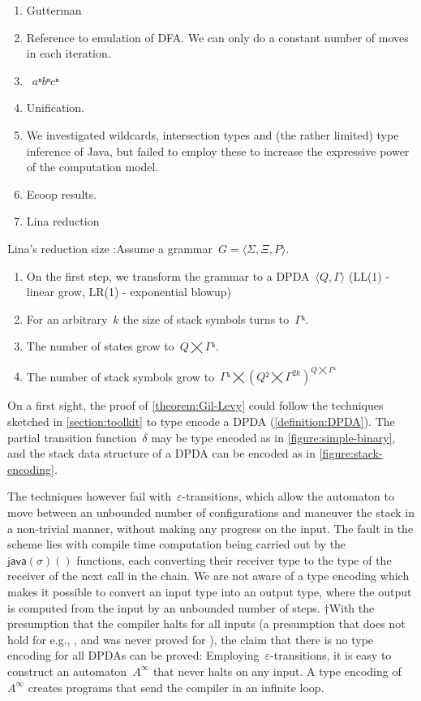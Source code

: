 \begin{enumerate}
  \item Gutterman
  \item Reference to emulation of DFA. We can only do
        a constant number of moves in each iteration.
  \item~$aⁿbⁿcⁿ$
  \item \Prolog Unification.
  \item We investigated wildcards, intersection types and
        (the rather limited) type inference of 
        Java, but failed to employ these to increase the expressive power of the computation model.
  \item Ecoop results.
  \item Lina reduction
\end{enumerate}

Lina's reduction size :Assume a grammar~$G=⟨Σ,Ξ, P⟩$.
    \begin{enumerate}
      \item On the first step, we transform the grammar to a DPDA~$⟨Q,Γ⟩$ (LL(1) - linear grow, LR(1) - exponential blowup)
      \item For an arbitrary~$k$ the size of stack symbols turns to~$Γᵏ$.
      \item The number of states grow to~$Q⨉Γᵏ$.
      \item The number of stack symbols grow to~$Γᵏ⨉(Q²⨉Γ^{2k})^{Q⨉Γᵏ}$
    \end{enumerate}

On a first sight, the proof of \cref{theorem:Gil-Levy} could follow the techniques
  sketched in \cref{section:toolkit} to type encode a DPDA (\cref{definition:DPDA}).
The partial transition function~$δ$ may be type encoded as in \cref{figure:simple-binary},
and the stack data structure of a DPDA can be encoded as in \cref{figure:stack-encoding}.

The techniques however fail with~$ε$-transitions,
  which allow the automaton to move between an unbounded number of
  configurations and maneuver the stack in a non-trivial manner,
  without making any progress on the input.
The fault in the scheme lies with compile time computation being carried out
  by the~$\textsf{java}(σ)()$ functions, each converting
  their receiver type to the type of the receiver of the next call in the chain.
We are not aware of a \Java type encoding which makes
  it possible to convert an input type into an output type, where
  the output is computed from the input by an unbounded number of steps.
  †{With the presumption that the \Java compiler halts for all inputs (a presumption that does
    not hold for e.g., \CC, and was never proved for \Java), the claim that there is no \Java 
    type encoding for all DPDAs can be proved:
    Employing~$ε$-transitions, it is easy to construct an automaton~$A^∞$ that
    never halts on any input.
    A type encoding of~$A^∞$ creates programs that send the compiler in an infinite loop.
  }


